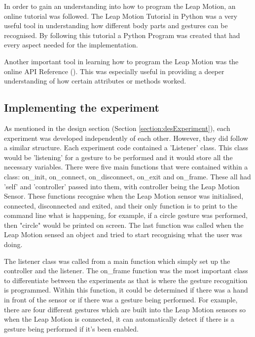 \documentclass{l4proj}
\begin{document}
In order to gain an understanding into how to program the Leap Motion, an online tutorial was followed. The \cite{Coding_Basics_2014} Leap Motion Tutorial in Python was a very useful tool in understanding how different body parts and gestures can be recognised. By following this tutorial a Python Program was created that had every aspect  needed for the implementation. 

Another important tool in learning how to program the Leap Motion was the online API Reference (\cite{leapmotion_api_nodate}). This was especially useful in providing a deeper understanding of how certain attributes or methods worked. 

\subsection{Implementing the experiment}
As mentioned in the design section (Section \ref{section:desExperiment}), each experiment was developed independently of each other. However, they did follow a similar structure. Each experiment code contained a 'Listener' class. This class would be 'listening' for a gesture to be performed and it would store all the necessary variables. There were five main functions that were contained within a class: on\_init, on\_connect, on\_disconnect, on\_exit and on\_frame. These all had 'self' and 'controller' passed into them, with controller being the Leap Motion Sensor. These functions recognise when the Leap Motion sensor was initialised, connected, disconnected and exited, and their only function is to print to the command line what is happening, for example, if a circle gesture was performed, then "circle" would be printed on screen. The last function was called when the Leap Motion sensed an object and tried to start recognising what the user was doing. 

The listener class was called from a main function which simply set up the controller and the listener. The on\_frame function was the most important class to differentiate between the experiments as that is where the gesture recognition is programmed. Within this function, it could be determined if there was a hand in front of the sensor or if there was a gesture being performed. For example, there are four different gestures which are built into the Leap Motion sensors so when the Leap Motion is connected, it can automatically detect if there is a gesture being performed if it's been enabled. 
\end{document}
